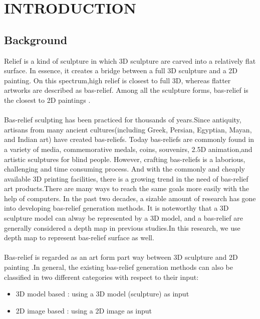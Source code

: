 \chapter{INTRODUCTION}

\section{Background}

Relief is a kind of sculpture in which 3D sculpture are carved into a relatively flat surface. In essence, it creates a bridge between a full 3D sculpture and a 2D painting. On this spectrum,high relief is closest to full 3D, whereas flatter artworks are described as bas-relief. Among all the sculpture forms, bas-relief is the closest to 2D paintings\cite{kerber2009feature} \cite{barron2012color}.\\ \\
Bas-relief sculpting has been practiced for thousands of years.Since antiquity, artisans from many ancient cultures(including Greek, Persian, Egyptian, Mayan, and Indian art) have created bas-reliefs.
Today bas-reliefs are commonly found in a variety of media, commemorative medals, coins, souvenirs, 2.5D animation,and artistic sculptures for blind people. However, crafting bas-reliefs is a laborious, challenging and time consuming process. And with the commonly and cheaply available 3D printing facilities, there is a growing trend in the need of bas-relief art products.There are many ways to reach the same goals more easily with the help of computers. In the past two decades, a sizable amount of research has gone into developing bas-relief generation methods\cite{benzaid2017analysis}. It is noteworthy that a 3D sculpture model can alway be represented by a 3D model, and a bas-relief are generally considered a depth map in previous studies.In this research, we use depth map to represent bas-relief surface as well.\\ \\ 
Bas-relief is regarded as an art form part way between 3D sculpture and 2D painting \cite{benzaid2017analysis}\cite{barron2012color}\cite{weyrich2007digital}\cite{kerber2009feature}\cite{kerber2012computer}.In general, the existing bas-relief generation methods can also be classified in two different categories with respect to their input\cite{benzaid2017analysis}:
\begin{itemize}
 \item 3D model based : using a 3D model (sculpture) as input 
 \item 2D image based : using a 2D image as input \\ \\
\end{itemize} 
